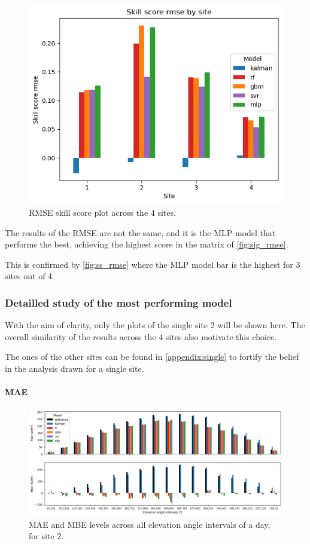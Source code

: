 \begin{figure}[htb!]
    \centering
    \includegraphics[width=0.5\columnwidth]{figures/first_study/ss_rmse.png}
    \caption{RMSE skill score plot across the 4 sites.}
    \label{fig:ss_rmse}
\end{figure}

The results of the RMSE are not the same, and it is the MLP model that performs the best, achieving the highest score in the matrix of \autoref{fig:sig_rmse}.

This is confirmed by \autoref{fig:ss_rmse} where the MLP model bar is the highest for 3 sites out of 4.

\newpage
\subsubsection{Detailled study of the most performing model}
With the aim of clarity, only the plots of the single site 2 will be shown here.
The overall similarity of the results across the 4 sites also motivate this choice.

The ones of the other sites can be found in \autoref{appendix:single} to fortify the belief in the analysis drawn for a single site.

\paragraph{MAE}\indent
\begin{figure}[htb!]
    \centering
    \includegraphics[width=1.1\columnwidth]{figures/first_study/mae_mbe_site2.png}
\caption{MAE and MBE levels across all elevation angle intervals of a day, for site 2.}
\label{fig:mae_mbe_site2}
\end{figure}

